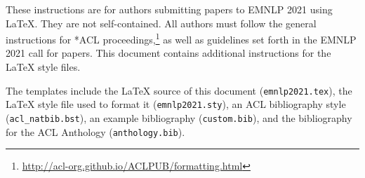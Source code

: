 These instructions are for authors submitting papers to EMNLP 2021 using \LaTeX. They are not self-contained. All authors must follow the general instructions for *ACL proceedings,\footnote{\url{http://acl-org.github.io/ACLPUB/formatting.html}} as well as guidelines set forth in the EMNLP 2021 call for papers. This document contains additional instructions for the \LaTeX{} style files.

The templates include the \LaTeX{} source of this document (\texttt{emnlp2021.tex}),
the \LaTeX{} style file used to format it (\texttt{emnlp2021.sty}),
an ACL bibliography style (\texttt{acl\_natbib.bst}),
an example bibliography (\texttt{custom.bib}),
and the bibliography for the ACL Anthology (\texttt{anthology.bib}).
